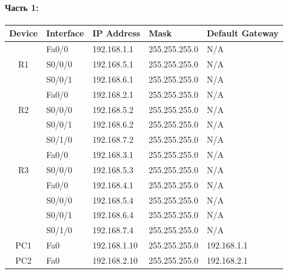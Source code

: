 \paragraph{Часть 1:}
\begin{center}
    \begin{tabular}{|c|l|l|l|l|}
        \hline
        Device              & Interface & IP Address   & Mask          & Default Gateway \\
        \hline
        \multirow{3}{*}{R1} & Fa0/0     & 192.168.1.1  & 255.255.255.0 & N/A             \\
        \cline{2-5}
        ~                   & S0/0/0    & 192.168.5.1  & 255.255.255.0 & N/A             \\
        \cline{2-5}
        ~                   & S0/0/1    & 192.168.6.1  & 255.255.255.0 & N/A             \\
        \hline
        \multirow{3}{*}{R2} & Fa0/0     & 192.168.2.1  & 255.255.255.0 & N/A             \\
        \cline{2-5}
        ~                   & S0/0/0    & 192.168.5.2  & 255.255.255.0 & N/A             \\
        \cline{2-5}
        ~                   & S0/0/1    & 192.168.6.2  & 255.255.255.0 & N/A             \\
        \cline{2-5}
        ~                   & S0/1/0    & 192.168.7.2  & 255.255.255.0 & N/A             \\
        \hline
        \multirow{3}{*}{R3} & Fa0/0     & 192.168.3.1  & 255.255.255.0 & N/A             \\
        \cline{2-5}
        ~                   & S0/0/0    & 192.168.5.3  & 255.255.255.0 & N/A             \\
        \hline
        \multirow{3}{*}{R4} & Fa0/0     & 192.168.4.1  & 255.255.255.0 & N/A             \\
        \cline{2-5}
        ~                   & S0/0/0    & 192.168.5.4  & 255.255.255.0 & N/A             \\
        \cline{2-5}
        ~                   & S0/0/1    & 192.168.6.4  & 255.255.255.0 & N/A             \\
        \cline{2-5}
        ~                   & S0/1/0    & 192.168.7.4  & 255.255.255.0 & N/A             \\
        \hline
        PC1                 & Fa0       & 192.168.1.10 & 255.255.255.0 & 192.168.1.1     \\
        \hline
        PC2                 & Fa0       & 192.168.2.10 & 255.255.255.0 & 192.168.2.1     \\

\end{tabular}
\end{center}
